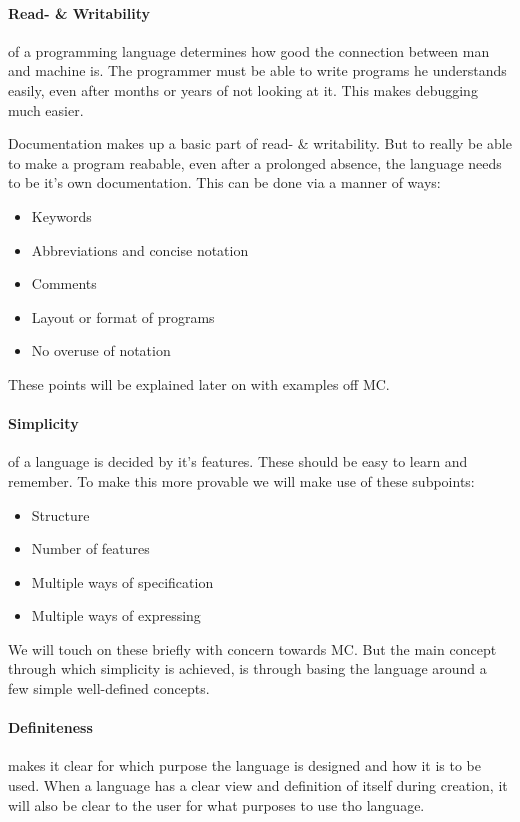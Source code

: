 \begin{multicols}{2}
\paragraph{Read- \& Writability }
of a programming language determines how good the connection between man and machine is.
 The programmer must be able to write programs he understands easily, even after months or years of not looking at it.
 This makes debugging much easier.

Documentation makes up a basic part of read- \& writability.
 But to really be able to make a program reabable, even after a prolonged absence, the language needs to be it's own documentation.
 This can be done via a manner of ways:
\begin{itemize}
  \item Keywords
  \item Abbreviations and concise notation
  \item Comments
  \item Layout or format of programs
  \item No overuse of notation
\end{itemize}
These points will be explained later on with examples off MC.
\cite{}

\paragraph{Simplicity}
of a language is decided by it's features.
 These should be easy to learn and remember.
 To make this more provable we will make use of these subpoints:
\begin{itemize}
  \item Structure
  \item Number of features
  \item Multiple ways of specification
  \item Multiple ways of expressing
\end{itemize}
We will touch on these briefly with concern towards MC.
\cite{} But the main concept through which simplicity is achieved, is through basing the language around a few simple well-defined concepts.
\cite{}

\paragraph{Definiteness}
makes it clear for which purpose the language is designed and how it is to be used.
 When a language has a clear view and definition of itself during creation, it will also be clear to the user for what purposes to use tho language.


\end{multicols}
